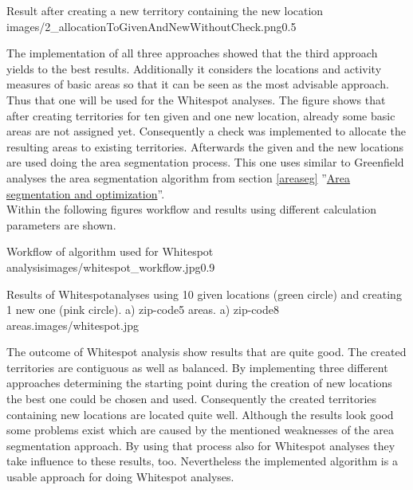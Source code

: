\begin{figurevarSize}{Result after creating a new territory containing the new location }{images/2_allocationToGivenAndNewWithoutCheck.png}{0.5}\end{figurevarSize}

The implementation of all three approaches showed that the third approach yields to the best results. Additionally it considers the locations and activity measures of basic areas so that it can be seen as the most advisable approach. Thus that one will be used for the Whitespot analyses. The figure shows that after creating territories for ten given and one new location, already some basic areas are not assigned yet. Consequently a check was implemented to allocate the resulting areas to existing territories. Afterwards the given and the new locations are used doing the area segmentation process. This one uses similar to Greenfield analyses the area segmentation algorithm from section \ref{areaseg} ''\hyperref[areaseg]{Area segmentation and optimization}''.\\
Within the following figures workflow and results using different calculation parameters are shown.

\begin{figurevarSize}{Workflow of algorithm used for Whitespot analysis}{images/whitespot_workflow.jpg}{0.9}\end{figurevarSize}

\begin{figureOwn}{Results of Whitespotanalyses using 10 given locations (green circle) and creating 1 new one (pink circle). a) zip-code5 areas. a) zip-code8 areas.}{images/whitespot.jpg}\end{figureOwn}

The outcome of Whitespot analysis show results that are quite good. The created territories are contiguous as well as balanced. By implementing three different approaches determining the starting point during the creation of new locations the best one could be chosen and used. Consequently the created territories containing new locations are located quite well. Although the results look good some problems exist which are caused by the mentioned weaknesses of the area segmentation approach. By using that process also for Whitespot analyses they take influence to these results, too. Nevertheless the implemented algorithm is a usable approach for doing Whitespot analyses.